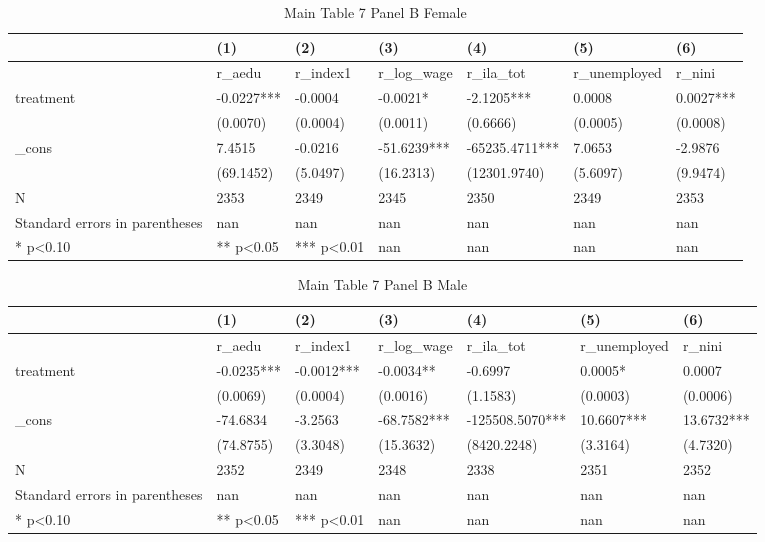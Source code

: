 \documentclass[11pt]{article}
\begin{document}
\clearpage
\begin{table}[!htbp]
\centering
\caption{Main Table 7 Panel B Female}
\label{tab:table7b_f}
\begin{tabular}{lllllll}
\toprule
 & (1) & (2) & (3) & (4) & (5) & (6) \\
\midrule
 & r\_aedu & r\_index1 & r\_log\_wage & r\_ila\_tot & r\_unemployed & r\_nini \\
treatment & -0.0227*** & -0.0004 & -0.0021* & -2.1205*** & 0.0008 & 0.0027*** \\
 & (0.0070) & (0.0004) & (0.0011) & (0.6666) & (0.0005) & (0.0008) \\
\_cons & 7.4515 & -0.0216 & -51.6239*** & -65235.4711*** & 7.0653 & -2.9876 \\
 & (69.1452) & (5.0497) & (16.2313) & (12301.9740) & (5.6097) & (9.9474) \\
N & 2353 & 2349 & 2345 & 2350 & 2349 & 2353 \\
Standard errors in parentheses & nan & nan & nan & nan & nan & nan \\
* p<0.10 & ** p<0.05 & *** p<0.01 & nan & nan & nan & nan \\
\bottomrule
\end{tabular}

\end{table}

\clearpage
\begin{table}[!htbp]
\centering
\caption{Main Table 7 Panel B Male}
\label{tab:table7b_m}
\begin{tabular}{lllllll}
\toprule
 & (1) & (2) & (3) & (4) & (5) & (6) \\
\midrule
 & r\_aedu & r\_index1 & r\_log\_wage & r\_ila\_tot & r\_unemployed & r\_nini \\
treatment & -0.0235*** & -0.0012*** & -0.0034** & -0.6997 & 0.0005* & 0.0007 \\
 & (0.0069) & (0.0004) & (0.0016) & (1.1583) & (0.0003) & (0.0006) \\
\_cons & -74.6834 & -3.2563 & -68.7582*** & -125508.5070*** & 10.6607*** & 13.6732*** \\
 & (74.8755) & (3.3048) & (15.3632) & (8420.2248) & (3.3164) & (4.7320) \\
N & 2352 & 2349 & 2348 & 2338 & 2351 & 2352 \\
Standard errors in parentheses & nan & nan & nan & nan & nan & nan \\
* p<0.10 & ** p<0.05 & *** p<0.01 & nan & nan & nan & nan \\
\bottomrule
\end{tabular}

\end{table}
\end{document}

